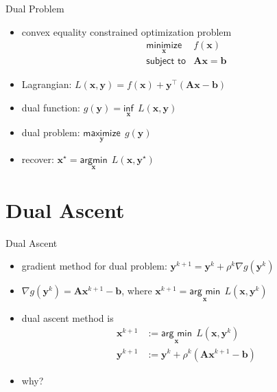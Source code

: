 \documentclass[aspectratio=169]{beamer}
\begin{document}
        \begin{frame}{Dual Problem}
          \begin{itemize}
            \item convex equality constrained optimization problem
             \begin{equation*}
                \begin{array}{ll}
                  \underset{\bm x}{\textsf{minimize}} & f(\bm x) \\
                  \textsf{subject to} & \bm A\bm x  = \bm b
                 \end{array}
            \end{equation*}
          \item Lagrangian: $L(\bm x, \bm y) = f(\bm x) + \bm y^\top(\bm A \bm x - \bm b)$
          \item dual function: $g(\bm y) = \underset{\bm x}{\textsf{inf}} ~~ L(\bm x, \bm y)$
          \item dual problem: $\underset{\bm y}{\textsf{maximize}} ~~ g(\bm y)$
          \item recover: $\bm x^\star = \underset{\bm x}{\textsf{argmin}}~~ L(\bm x, \bm y^\star)$
          \end{itemize}
        \end{frame}

        \section*{Dual Ascent}

        \begin{frame}{Dual Ascent}
          \begin{itemize}
            \item gradient method for dual problem: $\bm y^{k+1} = \bm y^k + \rho^k \nabla g(\bm y^k)$
            \item $\nabla g(\bm y^k) = \bm A \bm x^{k+1} - \bm b$, where $\bm x^{k+1} = \underset{\bm x}{\textsf{arg~min}}~~L(\bm x, \bm y^k)$
            \item dual ascent method is
            \begin{align*}
              \bm x^{k+1} &:= \underset{\bm x}{\textsf{arg~min}}~~L(\bm x, \bm y^k) \\
              \bm y^{k+1} &:= \bm y^k + \rho^k\left(\bm A \bm x^{k+1} - \bm b\right)
            \end{align*}
            \pause
            \item why?
          \end{itemize}
        \end{frame}
\end{document}
